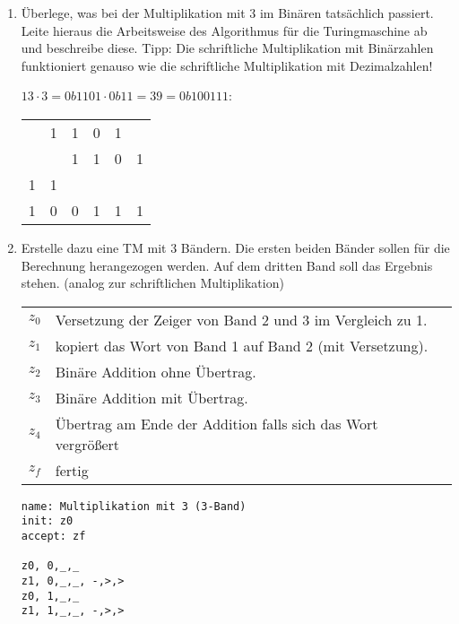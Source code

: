 \documentclass{bschlangaul-aufgabe}
\begin{document}
\begin{enumerate}


\item Überlege, was bei der Multiplikation mit 3 im Binären tatsächlich
passiert. Leite hieraus die Arbeitsweise des Algorithmus für die
Turingmaschine ab und beschreibe diese. Tipp: Die schriftliche
Multiplikation mit Binärzahlen funktioniert genauso wie die schriftliche
Multiplikation mit Dezimalzahlen!

\begin{bAntwort}
$13 \cdot 3 = 0b1101 \cdot 0b11 = 39 = 0b100111$:

\begin{center}
\begin{tabular}{llllll}
  & 1 & 1 & 0 & 1 &   \\
  &   & 1 & 1 & 0 & 1 \\
{\tiny 1} & {\tiny 1} &   &   &   &   \\\hline
1 & 0 & 0 & 1 & 1 & 1
\end{tabular}
\end{center}
\end{bAntwort}


\item Erstelle dazu eine TM mit 3 Bändern. Die ersten beiden Bänder
sollen für die Berechnung herangezogen werden. Auf dem dritten Band soll
das Ergebnis stehen. (analog zur schriftlichen Multiplikation)

\begin{bAntwort}
\begin{tabular}{ll}
$z_0$ & Versetzung der Zeiger von Band 2 und 3 im Vergleich zu 1. \\
$z_1$ & kopiert das Wort von Band 1 auf Band 2 (mit Versetzung). \\
$z_2$ & Binäre Addition ohne Übertrag. \\
$z_3$ & Binäre Addition mit Übertrag. \\
$z_4$ & Übertrag am Ende der Addition falls sich das Wort vergrößert \\
$z_f$ & fertig \\
\end{tabular}

\begin{verbatim}
name: Multiplikation mit 3 (3-Band)
init: z0
accept: zf

z0, 0,_,_
z1, 0,_,_, -,>,>
z0, 1,_,_
z1, 1,_,_, -,>,>


\end{verbatim}
\end{bAntwort}
\end{enumerate}
\end{document}

